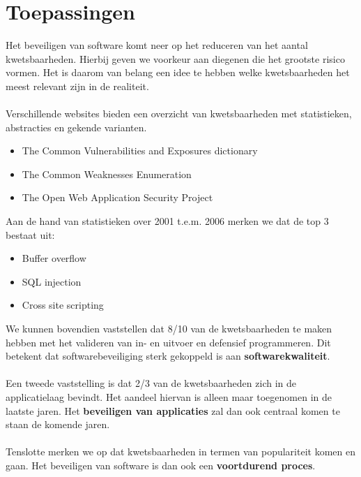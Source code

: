 \documentclass[../main.tex]{subfiles}
\begin{document}
\section{Toepassingen}
Het beveiligen van software komt neer op het reduceren van het aantal kwetsbaarheden. Hierbij geven we voorkeur aan diegenen die het grootste risico vormen. Het is daarom van belang een idee te hebben welke kwetsbaarheden het meest relevant zijn in de realiteit.
\\\\
Verschillende websites bieden een overzicht van kwetsbaarheden met statistieken, abstracties en gekende varianten.
\begin{itemize}
	\item The Common Vulnerabilities and Exposures dictionary
	\item The Common Weaknesses Enumeration
	\item The Open Web Application Security Project
\end{itemize}
\noindent
Aan de hand van statistieken over 2001 t.e.m. 2006 merken we dat de top 3 bestaat uit:
\begin{itemize}
	\item Buffer overflow
	\item SQL injection
	\item Cross site scripting
\end{itemize}
We kunnen bovendien vaststellen dat 8/10 van de kwetsbaarheden te maken hebben met het valideren van in- en uitvoer en defensief programmeren. Dit betekent dat softwarebeveiliging sterk gekoppeld is aan \textbf{softwarekwaliteit}.
\\\\
Een tweede vaststelling is dat 2/3 van de kwetsbaarheden zich in de applicatielaag bevindt. Het aandeel hiervan is alleen maar toegenomen in de laatste jaren. Het \textbf{beveiligen van applicaties} zal dan ook centraal komen te staan de komende jaren.
\\\\
Tenslotte merken we op dat kwetsbaarheden in termen van populariteit komen en gaan. Het beveiligen van software is dan ook een \textbf{voortdurend proces}.
\end{document}
